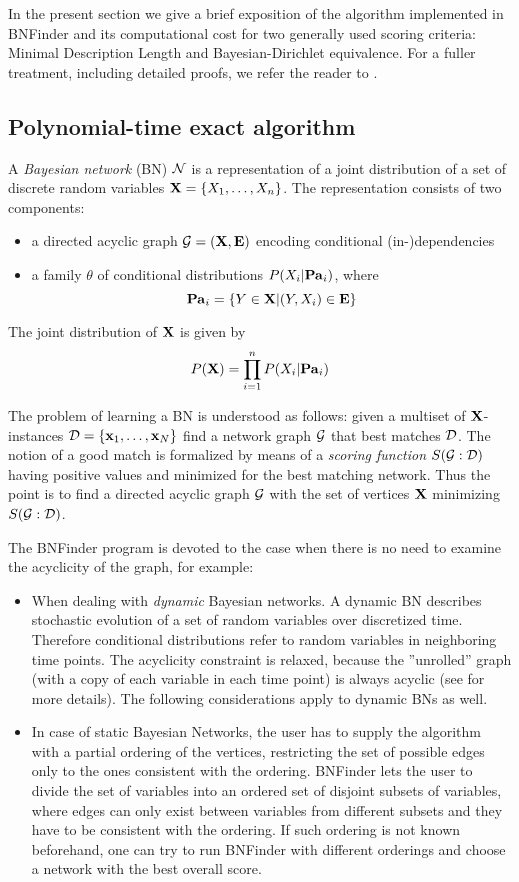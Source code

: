  In the present section we give a brief exposition of the algorithm implemented in BNFinder and its computational cost for two generally used scoring criteria: Minimal Description Length and Bayesian-Dirichlet equivalence.
 For a fuller treatment, including detailed proofs, we refer the reader to
     \cite{dojer06,dojer10}.

\subsection{Polynomial-time exact algorithm}

 A \emph{Bayesian network} (BN) $\mathcal{N}$ is a representation of a joint distribution of a set of discrete random variables $\mathbf{X}=\{X_1,\ldots,X_n\}$.
 The representation consists of two components:
 \begin{itemize}
  \item a directed acyclic graph $\mathcal{G}=(\mathbf{X},\mathbf{E})$ encoding conditional (in-)dependencies
  \item a family $\theta$ of conditional distributions $P(X_i|\mathbf{Pa}_i)$, where
   $$\mathbf{Pa}_i=\{Y\in\mathbf{X}|(Y,X_i)\in\mathbf{E}\}$$
 \end{itemize}
 The joint distribution of $\mathbf{X}$ is given by
 \begin{equation}\label{joinprob}
 P(\X)=\prod_{i=1}^n P(X_i|\Pa_i)
 \end{equation}

 The problem of learning a BN is understood as follows: 
 given a multiset of $\mathbf{X}$-instances $\mathcal{D}=\{\mathbf{x}_1,\ldots,\mathbf{x}_N\}$ find a network graph $\mathcal{G}$ that best matches $\mathcal{D}$.
 The notion of a good match is formalized by means of a \emph{scoring function} $S(\mathcal{G}:\mathcal{D})$ having positive values and minimized for the best matching network. 
 Thus the point is to find a directed acyclic graph $\mathcal{G}$ with the set of vertices $\mathbf{X}$ minimizing $S(\mathcal{G}:\mathcal{D})$.
 
 The BNFinder program is devoted to the case when there is no need to examine the acyclicity of the graph, for example:
 \begin{itemize}
  \item When dealing with \emph{dynamic} Bayesian networks. A dynamic BN  describes stochastic evolution of a set of random variables over discretized time. Therefore conditional distributions refer to random variables in neighboring time points. The acyclicity constraint is relaxed, because the ''unrolled'' graph (with a copy of each variable in each time point) is always acyclic (see \cite{friedman98} for more details). The following considerations apply to dynamic BNs as well. 
  \item In case of static Bayesian Networks, the user has to supply the
   algorithm with a partial ordering of the vertices, restricting the
   set of possible edges only to the ones consistent with the
   ordering. BNFinder lets the user to divide the set of variables into an
   ordered set of disjoint subsets of variables, where edges can only
   exist between variables from different subsets and they have to be
   consistent with the ordering. If such ordering is not known
   beforehand, one can try to run BNFinder with different orderings and
   choose a network with the best overall score.
 \end{itemize}
 
